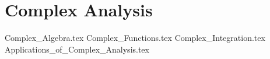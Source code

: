 \section{Complex Analysis}

{Complex_Algebra.tex}
{Complex_Functions.tex}
{Complex_Integration.tex}
{Applications_of_Complex_Analysis.tex}